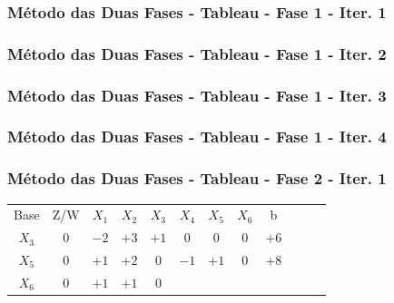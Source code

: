 \documentclass{beamer}
\begin{document}
\begin{frame}

	{
		\frametitle{Método das Duas Fases - Tableau - \color{pink}Fase 1 - \color{green}Iter. 1}
	}
	{
		\frametitle{Método das Duas Fases - Tableau - \color{pink}Fase 1 - \color{green}Iter. 2}
	}
	{
		\frametitle{Método das Duas Fases - Tableau - \color{pink}Fase 1 - \color{green}Iter. 3}
	}
	{
		\frametitle{Método das Duas Fases - Tableau - \color{pink}Fase 1 - \color{green}Iter. 4}
	}
	{
		\frametitle{Método das Duas Fases - Tableau - \color{pink}Fase 2 - \color{green}Iter. 1}
	}
	
	
	{
		\begin{table}		
			\begin{tabular}{c c c c c c c c c c c c}
				\cline{1-8} 
				\cellcolor{blue!100} \color{white} \scriptsize Base 
				&\cellcolor{blue!100} \color{white} \scriptsize Z/W
				&\cellcolor{blue!100} \color{white} $\scriptstyle X_1$ 
				&\cellcolor{blue!100} \color{white} $\scriptstyle X_2$ 
				&\cellcolor{blue!100} \color{red}   $\scriptstyle X_3$ 
				&\cellcolor{blue!100} \color{white} $\scriptstyle X_4$ 
				&\cellcolor{blue!100} \color{red}   $\scriptstyle X_5$ 
				&\cellcolor{blue!100} \color{red}   $\scriptstyle X_6$ 
				&\cellcolor{blue!100} \color{white} \scriptsize b
				&
				&
				& \\
				\cellcolor{blue!100} \color{red} $\scriptstyle X_3$
				& \cellcolor{yellow!50} $\scriptstyle 0$
				& \cellcolor{yellow!50} $\scriptstyle -2$
				& \cellcolor{yellow!50} $\scriptstyle +3$
				& \cellcolor{yellow!50} $\scriptstyle +1$
				& \cellcolor{yellow!50} $\scriptstyle 0$
				& \cellcolor{yellow!50} $\scriptstyle 0$
				& \cellcolor{yellow!50} $\scriptstyle 0$
				& \cellcolor{yellow!50} $\scriptstyle +6$ \\
			    \cellcolor{blue!100} \color{red} $\scriptstyle X_5$
				& \cellcolor{yellow!50} $\scriptstyle 0$
				& \cellcolor{yellow!50} $\scriptstyle +1$
				& \cellcolor{yellow!50} $\scriptstyle +2$
				& \cellcolor{yellow!50} $\scriptstyle 0$			
				& \cellcolor{yellow!50} $\scriptstyle -1$
				& \cellcolor{yellow!50} $\scriptstyle +1$
				& \cellcolor{yellow!50} $\scriptstyle 0$ 
				& \cellcolor{yellow!50} $\scriptstyle +8$ \\
				\cellcolor{blue!100} \color{red} $\scriptstyle X_6$
				& \cellcolor{yellow!50} $\scriptstyle 0$
				& \cellcolor{yellow!50} $\scriptstyle +1$
				& \cellcolor{yellow!50} $\scriptstyle +1$
				& \cellcolor{yellow!50} $\scriptstyle 0$

\end{tabular}
\end{table}}
\end{frame}
\end{document}
